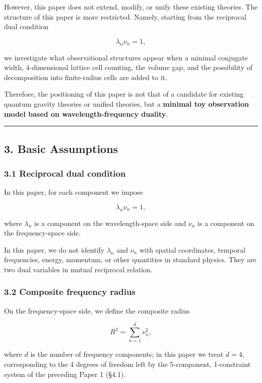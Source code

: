 \documentclass[
]{article}
\begin{document}
However, this paper does not extend, modify, or unify these existing
theories. The structure of this paper is more restricted. Namely,
starting from the reciprocal dual condition

\[
\lambda_n\nu_n=1,
\]

we investigate what observational structures appear when a minimal
conjugate width, 4-dimensional lattice cell counting, the volume gap,
and the possibility of decomposition into finite-radius cells are added
to it.

Therefore, the positioning of this paper is not that of a candidate for
existing quantum gravity theories or unified theories, but a
\textbf{minimal toy observation model based on wavelength-frequency
duality}.

\begin{center}\rule{0.5\linewidth}{0.5pt}\end{center}

\subsection{3. Basic Assumptions}\label{basic-assumptions}

\subsubsection{3.1 Reciprocal dual
condition}\label{reciprocal-dual-condition}

In this paper, for each component we impose

\[
\lambda_n\nu_n=1,
\]

where \(\lambda_n\) is a component on the wavelength-space side and
\(\nu_n\) is a component on the frequency-space side.

In this paper, we do not identify \(\lambda_n\) and \(\nu_n\) with
spatial coordinates, temporal frequencies, energy, momentum, or other
quantities in standard physics. They are two dual variables in mutual
reciprocal relation.

\subsubsection{3.2 Composite frequency
radius}\label{composite-frequency-radius}

On the frequency-space side, we define the composite radius

\[
R^2=\sum_{n=1}^{d}\nu_n^2,
\]

where \(d\) is the number of frequency components; in this paper we
treat \(d=4\), corresponding to the 4 degrees of freedom left by the
5-component, 1-constraint system of the preceding Paper 1 (§4.1).
\end{document}
